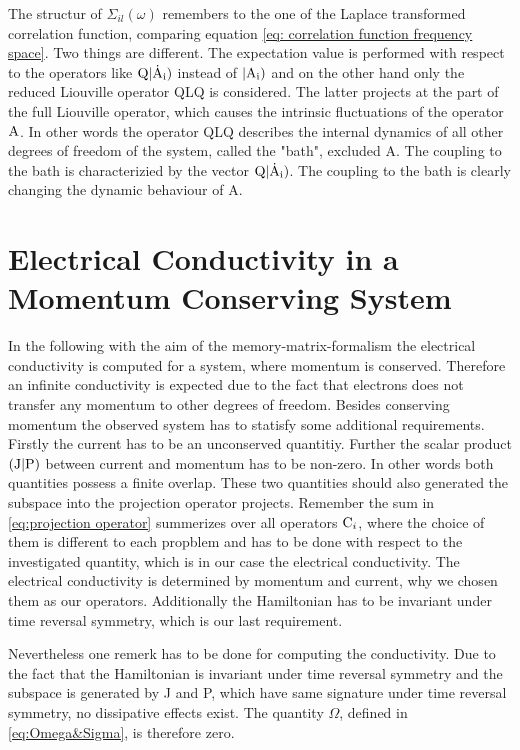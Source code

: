 The structur of $\Sigma_{il}(\omega)$ remembers to the one of the Laplace transformed correlation function, comparing equation \eqref{eq: correlation function frequency space}.
Two things are different.
The expectation value is performed with respect to the operators like $\mathrm{Q}|\mathrm{\dot{\mathrm{A}}_{i}})$ instead of $|\mathrm{\mathrm{A}_{i}})$ and on the other hand only the reduced Liouville operator QLQ is considered.
The latter projects at the part of the full Liouville operator, which causes the intrinsic fluctuations of the operator $\mathrm{A}$.
In other words the operator QLQ describes the internal dynamics of all other degrees of freedom of the system, called the "bath", excluded A.
The coupling to the bath is characterizied by the vector $\mathrm{Q}|\mathrm{\dot{\mathrm{A}}_{i}})$.
The coupling to the bath is clearly changing the dynamic behaviour of A.
%
%
\section{Electrical Conductivity in a Momentum Conserving System}
\label{sec:conductivity conserved momentum}
%
%
In the following with the aim of the memory-matrix-formalism the electrical conductivity is computed for a system, where momentum is conserved.
Therefore an infinite conductivity is expected due to the fact that electrons does not transfer any momentum to other degrees of freedom.
Besides conserving momentum the observed system has to statisfy some additional requirements.
Firstly the current has to be an unconserved quantitiy.
Further the scalar product $({\mathrm{J}}|{\mathrm{P}})$ between current and momentum has to be non-zero.
In other words both quantities possess a finite overlap.
These two quantities should also generated the subspace into the projection operator projects.
Remember the sum in \eqref{eq:projection operator} summerizes over all operators $\mathrm{C}_{i}$, where the choice of them is different to each propblem and has to be done with respect to the investigated quantity, which is in our case the electrical conductivity.
The electrical conductivity is determined by momentum and current, why we chosen them as our operators.
Additionally the Hamiltonian has to be invariant under time reversal symmetry, which is our last requirement.

Nevertheless one remerk has to be done for computing the conductivity.
Due to the fact that the Hamiltonian is invariant under time reversal symmetry and the subspace is generated by J and P, which have same signature under time reversal symmetry, no dissipative effects exist.
The quantity $\Omega$, defined in \eqref{eq:Omega&Sigma}, is therefore zero.

